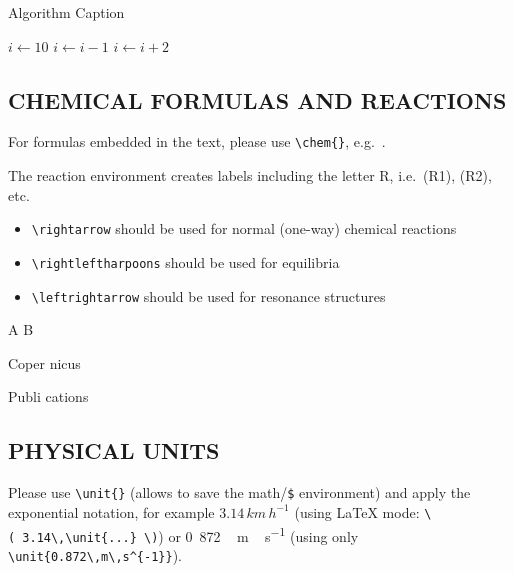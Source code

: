 \documentclass[, manuscript]{copernicus}
\begin{document}
\begin{algorithm}
\caption{Algorithm Caption}
\label{a1}
\begin{algorithmic}
\STATE $i\gets 10$
        \STATE $i\gets i-1$
\ELSE
                \STATE $i\gets i+2$
        \ENDIF
\ENDIF
\end{algorithmic}
\end{algorithm}

\subsection{CHEMICAL FORMULAS AND REACTIONS}

For formulas embedded in the text, please use
\texttt{\textbackslash{}chem\{\}}, e.g.~.

The reaction environment creates labels including the letter R,
i.e.~(R1), (R2), etc.

\begin{itemize}
\item
  \texttt{\textbackslash{}rightarrow} should be used for normal
  (one-way) chemical reactions
\item
  \texttt{\textbackslash{}rightleftharpoons} should be used for
  equilibria
\item
  \texttt{\textbackslash{}leftrightarrow} should be used for resonance
  structures
\end{itemize}

\begin{reaction}
A \rightarrow B \\
\end{reaction}
\begin{reaction}
Coper \rightleftharpoons nicus \\
\end{reaction}
\begin{reaction}
Publi \leftrightarrow cations
\end{reaction}

\subsection{PHYSICAL UNITS}

Please use \texttt{\textbackslash{}unit\{\}} (allows to save the
math/\texttt{\$} environment) and apply the exponential notation, for
example \(3.14\,\unit{km\,h^{-1}}\) (using LaTeX mode:
\texttt{\textbackslash{}(\ 3.14\textbackslash{},\textbackslash{}unit\{...\}\ \textbackslash{})})
or \unit{0.872\,m\,s^{-1}} (using only
\texttt{\textbackslash{}unit\{0.872\textbackslash{},m\textbackslash{},s\^{}\{-1\}\}}).
\end{document}
